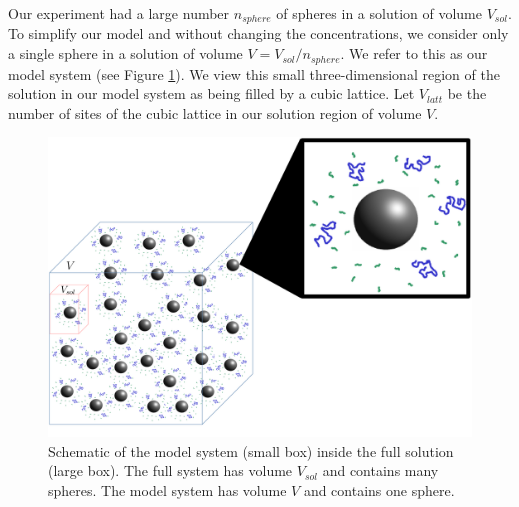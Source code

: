\documentclass[journal=mamobx,manuscript=article]{achemso}
\begin{document}
Our experiment had a large number $n_{sphere}$ of spheres in a solution of volume $V_{sol}$.  
To simplify 
our model and without changing the concentrations, we consider only a single sphere in a solution
of volume $V=V_{sol}/n_{sphere}$.  We refer to this as our model system (see Figure \ref{figure1volume}).
We view this small three-dimensional region of the solution in our model system as being filled by a 
cubic lattice.
Let $V_{latt}$ be the number of sites of the cubic 
lattice in our solution region of volume $V$.




 \begin{figure}[H] 
  \includegraphics[scale=0.15]{fig7a_may3_2020.pdf}
\caption{Schematic of the model system (small box)
inside the full solution (large box). The full system
has volume $V_{sol}$ and contains many spheres.  The model
system has volume $V$ and contains one sphere.}
\label{figure1volume}
\end{figure}


\end{document}
